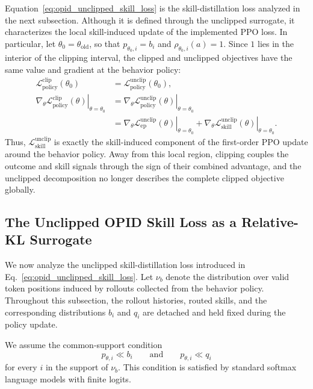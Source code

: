 \documentclass{llmxive}
\begin{document}
Equation~\ref{eq:opid_unclipped_skill_loss} is the skill-distillation
loss analyzed in the next subsection. Although it is defined through the
unclipped surrogate, it characterizes the local skill-induced update of
the implemented PPO loss. In particular, let
\(\theta_0=\theta_{\mathrm{old}}\), so that
\(p_{\theta_0,i}=b_i\) and
\(\rho_{\theta_0,i}(a)=1\). Since \(1\) lies in the interior of the
clipping interval, the clipped and unclipped objectives have the same
value and gradient at the behavior policy:
\begin{equation*}
\begin{aligned}
 \mathcal L_{\mathrm{policy}}^{\mathrm{clip}}(\theta_0)
 &=
 \mathcal L_{\mathrm{policy}}^{\mathrm{unclip}}(\theta_0),
 \\
 \left.
 \nabla_\theta
 \mathcal L_{\mathrm{policy}}^{\mathrm{clip}}(\theta)
 \right|_{\theta=\theta_0}
 &=
 \left.
 \nabla_\theta
 \mathcal L_{\mathrm{policy}}^{\mathrm{unclip}}(\theta)
 \right|_{\theta=\theta_0}
 \\
 &=
 \left.
 \nabla_\theta
 \mathcal L_{\mathrm{ep}}^{\mathrm{unclip}}(\theta)
 \right|_{\theta=\theta_0}
 +
 \left.
 \nabla_\theta
 \mathcal L_{\mathrm{skill}}^{\mathrm{unclip}}(\theta)
 \right|_{\theta=\theta_0}.
\end{aligned}
\end{equation*}
Thus,
\(\mathcal L_{\mathrm{skill}}^{\mathrm{unclip}}\) is exactly the
skill-induced component of the first-order PPO update around the behavior
policy. Away from this local region, clipping couples the outcome and
skill signals through the sign of their combined advantage, and the
unclipped decomposition no longer describes the complete clipped
objective globally.

\subsection{The Unclipped OPID Skill Loss as a Relative-KL Surrogate}
\label{app:teacher_advantage}

We now analyze the unclipped skill-distillation loss introduced in
Eq.~\ref{eq:opid_unclipped_skill_loss}. Let \(\nu_b\) denote the
distribution over valid token positions induced by rollouts collected from
the behavior policy. Throughout this subsection, the rollout histories,
routed skills, and the corresponding distributions \(b_i\) and \(q_i\) are
detached and held fixed during the policy update.

We assume the common-support condition
\begin{equation*}
 p_{\theta,i}\ll b_i
 \qquad\text{and}\qquad
 p_{\theta,i}\ll q_i
\end{equation*}
for every \(i\) in the support of \(\nu_b\). This condition is satisfied by
standard softmax language models with finite logits.
\end{document}
